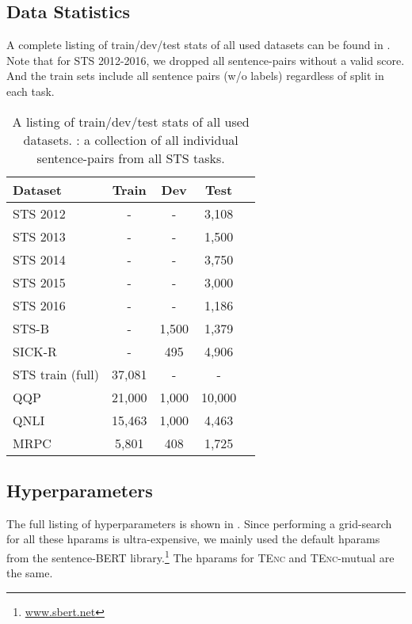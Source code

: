 \documentclass{article} \usepackage{iclr2021_conference,times}
\newcommand{\tenc}{\textsc{TEnc}\xspace}
\begin{document}
\subsection{Data Statistics}\label{sec:data_stats}

A complete listing of train/dev/test stats of all used datasets can be found in . Note that for STS 2012-2016, we dropped all sentence-pairs without a valid score. And the train sets include all sentence pairs (w/o labels) regardless of split in each task.

\begin{table*}[h] \small
\centering
\begin{tabular}{lcccc}
\toprule
Dataset & Train & Dev & Test \\
\midrule
STS 2012 & - & - & 3,108 \\
STS 2013 & - & - & 1,500 \\
STS 2014 & - & - & 3,750 \\
STS 2015 & - & - & 3,000 \\
STS 2016 & - & - & 1,186 \\
STS-B & - & 1,500  & 1,379 \\
SICK-R & - & 495 & 4,906 \\
STS train (full) & 37,081 & - & -\\
\midrule
QQP & 21,000 & 1,000 & 10,000 \\
QNLI & 15,463 & 1,000 & 4,463 \\
MRPC & 5,801 & 408 & 1,725 \\
\bottomrule
\end{tabular}
\caption{A listing of train/dev/test stats of all used datasets. : a collection of all individual sentence-pairs from all STS tasks.}
\label{tab:data_stat}
\end{table*}


\subsection{Hyperparameters}\label{sec:hparams}
The full listing of hyperparameters is shown in . 
Since performing a grid-search for all these hparams is ultra-expensive, we mainly used the default hparams from the sentence-BERT library.\footnote{\url{www.sbert.net}} 
The hparams for \tenc and \tenc-mutual are the same.
\end{document}

